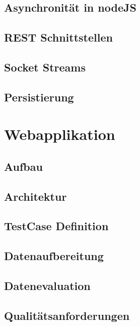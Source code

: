		\subsection{Asynchronität in nodeJS}
		\subsection{REST Schnittstellen}
		\subsection{Socket Streams}
		\subsection{Persistierung}
	\section{Webapplikation}
		\subsection{Aufbau}
		\subsection{Architektur}
		\subsection{TestCase Definition}
		\subsection{Datenaufbereitung}
		\subsection{Datenevaluation}
		\subsection{Qualitätsanforderungen}

